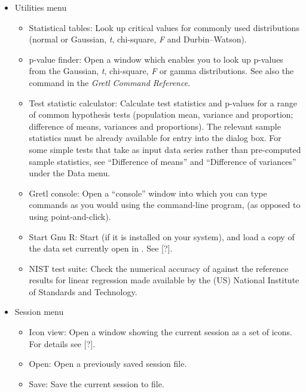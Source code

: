 \begin{itemize}
\item \textsf{Utilities menu}
  \begin{itemize}
  \item \textsf{Statistical tables}: Look up critical values for
    commonly used distributions (normal or Gaussian, \emph{t},
    chi-square, \emph{F} and Durbin--Watson).
  \item \textsf{p-value finder}: Open a window which enables you to
    look up p-values from the Gaussian, \emph{t}, chi-square, \emph{F}
    or gamma distributions. See also the  command in the
    \emph{Gretl Command Reference}.
	    
  \item \textsf{Test statistic calculator}: Calculate test statistics
    and p-values for a range of common hypothesis tests (population
    mean, variance and proportion; difference of means, variances and
    proportions).  The relevant sample statistics must be already
    available for entry into the dialog box. For some simple tests
    that take as input data series rather than pre-computed sample
    statistics, see ``Difference of means'' and ``Difference of
    variances'' under the Data menu.
  \item \textsf{Gretl console}: Open a ``console'' window into which
    you can type commands as you would using the command-line program,
     (as opposed to using point-and-click).
	    
  \item \textsf{Start Gnu R}: Start  (if it is installed on
    your system), and load a copy of the data set currently open in
    .  See [?].
	    
  \item \textsf{NIST test suite}: Check the numerical accuracy of
     against the reference results for linear regression
    made available by the (US) National Institute of Standards and
    Technology.
  \end{itemize}

\item \textsf{Session menu}
  \begin{itemize}
  \item \textsf{Icon view}: Open a window showing the current
     session as a set of icons.  For details see [?].
	    
  \item \textsf{Open}: Open a previously saved session file.
	    
  \item \textsf{Save}: Save the current session to file.
	    

\end{itemize}
\end{itemize}
